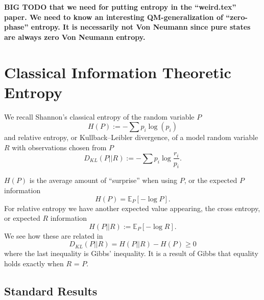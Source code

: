 \documentclass[12pt,a4paper]{article}
\begin{document}
{\bf BIG TODO that we need for putting entropy in the ``weird.tex'' paper.  We need to know an interesting QM-generalization of ``zero-phase'' entropy.  It is necessarily not Von Neumann since pure states are always zero Von Neumann entropy.}

\section{Classical Information Theoretic Entropy}
We recall Shannon's classical entropy of the random variable $P$
\[
 H(P) := -\sum p_i \log(p_i)
\]
and relative entropy, or Kullback–Leibler divergence, of a model random variable $R$ with observations chosen from $P$
\[
D_{KL}(P||R) := -\sum p_i \log{\frac{r_i}{p_i}}.
\]

$H(P)$ is the average amount of ``surprise'' when using $P$, or the expected $P$ information
\[
H(P) = \mathbb{E}_P[-\log{P}].
\] 
For relative entropy we have another expected value appearing, the cross entropy, or expected $R$ information
\[
H(P||R) := \mathbb{E}_P[-\log{R}].
\]
We see how these are related in
\[
D_{KL}(P||R)  = H(P||R) -  H(P)  \ge 0
\]
where the last inequality is Gibbs' inequality.  It is a result of Gibbs that equality holds exactly when $R$ = $P$.

\subsection{Standard Results}
\end{document}
